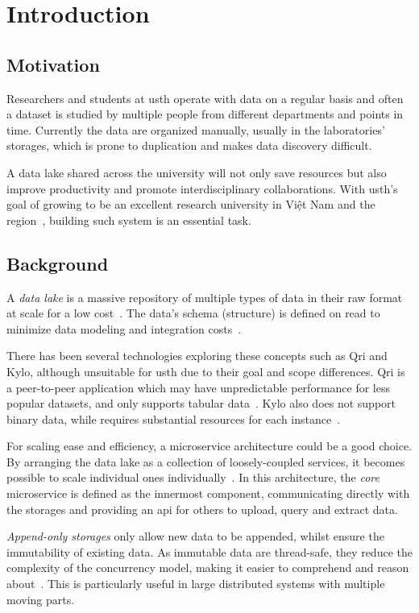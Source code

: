 \chapter{Introduction}
\section{Motivation}
Researchers and students at \gls{usth} operate with data on a regular basis
and often a dataset is studied by multiple people from different departments
and points in time.  Currently the data are organized manually, usually in
the laboratories' storages, which is prone to duplication and makes
data discovery difficult.

A data lake shared across the university will not only save resources
but also improve productivity and promote interdisciplinary collaborations.
With \gls{usth}'s goal of growing to be an excellent research university
in {Việt Nam} and the region~\cite{usth},
building such system is an essential task.

\section{Background}
A \emph{data lake} is a massive repository of multiple types of data
in their raw format at scale for a low cost~\cite{lake}.
The data's schema (structure) is defined on read to minimize data modeling
and integration costs~\cite{lake}.

There has been several technologies exploring these concepts such as
Qri and Kylo, although unsuitable for \gls{usth} due to their goal
and scope differences.  Qri is a peer-to-peer application which may have
unpredictable performance for less popular datasets, and only supports
tabular data~\cite{qri}.  Kylo also does not support binary data,
while requires substantial resources for each instance~\cite{kylo}.

For scaling ease and efficiency, a microservice architecture
could be a good choice.  By arranging the data lake as a collection
of loosely-coupled services, it becomes possible to scale individual ones
individually~\cite{micro}.  In this architecture, the \emph{core} microservice
is defined as the innermost component, communicating directly with the storages
and providing an \gls{api} for others to upload, query and extract data.

\emph{Append-only storages} only allow new data to be appended, whilst ensure
the immutability of existing data.  As immutable data are thread-safe,
they reduce the complexity of the concurrency model, making it easier
to comprehend and reason about~\cite{pure}.  This is particularly useful
in large distributed systems with multiple moving parts.

